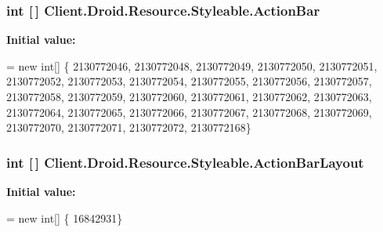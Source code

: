 \subsubsection[{Action\+Bar}]{\setlength{\rightskip}{0pt plus 5cm}int \mbox{[}$\,$\mbox{]} Client.\+Droid.\+Resource.\+Styleable.\+Action\+Bar\hspace{0.3cm}{\ttfamily [static]}}\label{classClient_1_1Droid_1_1Resource_1_1Styleable_a61e7d2ee0017ebbad2ded5ea0fa22edc}
{\bfseries Initial value\+:}
\begin{DoxyCode}
= \textcolor{keyword}{new} \textcolor{keywordtype}{int}[]
            \{
                    2130772046,
                    2130772048,
                    2130772049,
                    2130772050,
                    2130772051,
                    2130772052,
                    2130772053,
                    2130772054,
                    2130772055,
                    2130772056,
                    2130772057,
                    2130772058,
                    2130772059,
                    2130772060,
                    2130772061,
                    2130772062,
                    2130772063,
                    2130772064,
                    2130772065,
                    2130772066,
                    2130772067,
                    2130772068,
                    2130772069,
                    2130772070,
                    2130772071,
                    2130772072,
                    2130772168\}
\end{DoxyCode}
\hypertarget{classClient_1_1Droid_1_1Resource_1_1Styleable_ad4513c084ad6e5b49292cc4c5ccd3e59}{}
\subsubsection[{Action\+Bar\+Layout}]{\setlength{\rightskip}{0pt plus 5cm}int \mbox{[}$\,$\mbox{]} Client.\+Droid.\+Resource.\+Styleable.\+Action\+Bar\+Layout\hspace{0.3cm}{\ttfamily [static]}}\label{classClient_1_1Droid_1_1Resource_1_1Styleable_ad4513c084ad6e5b49292cc4c5ccd3e59}
{\bfseries Initial value\+:}
\begin{DoxyCode}
= \textcolor{keyword}{new} \textcolor{keywordtype}{int}[]
            \{
                    16842931\}
\end{DoxyCode}
\hypertarget{classClient_1_1Droid_1_1Resource_1_1Styleable_ae2fb481885aeef4d019164cd289a0e22}{}
